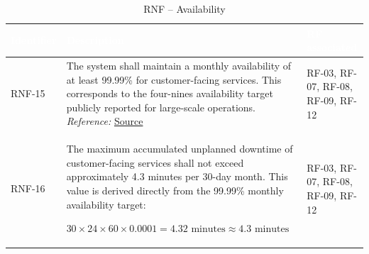 \documentclass{article}
\begin{document}
\begin{table}[H]

\centering

\small

\renewcommand{\arraystretch}{1.35}

\caption{RNF -- Availability}

\label{tab:rnf_availability}

\begin{tabularx}{\textwidth}{|p{2.2cm}|X|p{3.5cm}|}

\hline

\rowcolor[HTML]{1F2937}

\textcolor{white}{\textbf{Identifier}} &
\textcolor{white}{\textbf{Description}} &
\textcolor{white}{\textbf{RF associated}} \\ \hline

RNF-15 &
The system shall maintain a monthly availability of at least 99.99\% for customer-facing services. This corresponds to the four-nines availability target publicly reported for large-scale operations.
\textit{Reference:} \href{https://www.infoq.com/news/2016/03/Netflix-Cloud-Migration/}{Source}
&
RF-03, RF-07, RF-08, RF-09, RF-12 \\ \hline

RNF-16 &
The maximum accumulated unplanned downtime of customer-facing services shall not exceed approximately 4.3 minutes per 30-day month. This value is derived directly from the 99.99\% monthly availability target:

\(\displaystyle
30\times24\times60\times0.0001
=
4.32\text{ minutes}
\approx4.3\text{ minutes}
\)
&
RF-03, RF-07, RF-08, RF-09, RF-12 \\ \hline

\end{tabularx}

\end{table}


\end{document}
